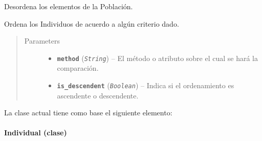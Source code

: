 \documentclass[letterpaper,10pt,english]{sphinxmanual}
\begin{document}
\begin{fulllineitems}
\begin{fulllineitems}
\begin{quote}
\begin{description}
\end{description}\end{quote}

\end{fulllineitems}


\begin{fulllineitems}
\label{Model/Community/Population/Population:Model.Community.Population.Population.Population.shuffle_individuals}
Desordena los elementos de la Población.

\end{fulllineitems}


\begin{fulllineitems}
\label{Model/Community/Population/Population:Model.Community.Population.Population.Population.sort_individuals}
Ordena los Individuos de acuerdo a algún criterio dado.
\begin{quote}\begin{description}
\item[{Parameters}] \leavevmode\begin{itemize}
\item {} 
\textbf{\texttt{method}} (\emph{\texttt{String}}) -- El método o atributo sobre el cual se hará la comparación.

\item {} 
\textbf{\texttt{is\_descendent}} (\emph{\texttt{Boolean}}) -- Indica si el ordenamiento es ascendente o descendente.

\end{itemize}

\end{description}\end{quote}

\end{fulllineitems}


\end{fulllineitems}


La clase actual tiene como base el siguiente elemento:


\paragraph{Individual (clase)}
\label{Model/Community/Population/Individual/Individual:individual-clase}\label{Model/Community/Population/Individual/Individual:module-Model.Community.Population.Individual.Individual}\label{Model/Community/Population/Individual/Individual::doc}
\end{document}
